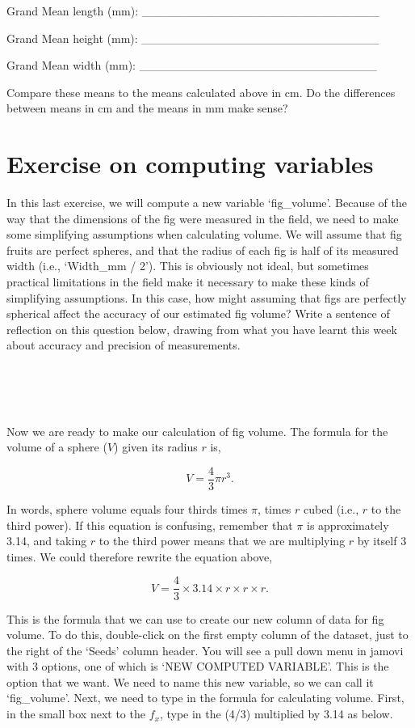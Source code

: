 \documentclass[
]{scrbook}
\begin{document}
Grand Mean length (mm): \_\_\_\_\_\_\_\_\_\_\_\_\_\_\_\_\_\_\_\_\_\_\_\_\_\_\_\_

Grand Mean height (mm): \_\_\_\_\_\_\_\_\_\_\_\_\_\_\_\_\_\_\_\_\_\_\_\_\_\_\_\_

Grand Mean width (mm): \_\_\_\_\_\_\_\_\_\_\_\_\_\_\_\_\_\_\_\_\_\_\_\_\_\_\_\_

Compare these means to the means calculated above in cm.
Do the differences between means in cm and the means in mm make sense?

\hypertarget{computing_variables_02}{%
\section{Exercise on computing variables}\label{computing_variables_02}}

In this last exercise, we will compute a new variable `fig\_volume'.
Because of the way that the dimensions of the fig were measured in the field, we need to make some simplifying assumptions when calculating volume.
We will assume that fig fruits are perfect spheres, and that the radius of each fig is half of its measured width (i.e., `Width\_mm / 2').
This is obviously not ideal, but sometimes practical limitations in the field make it necessary to make these kinds of simplifying assumptions.
In this case, how might assuming that figs are perfectly spherical affect the accuracy of our estimated fig volume?
Write a sentence of reflection on this question below, drawing from what you have learnt this week about accuracy and precision of measurements.

\begin{verbatim}




\end{verbatim}

Now we are ready to make our calculation of fig volume.
The formula for the volume of a sphere (\(V\)) given its radius \(r\) is,

\[V = \frac{4}{3} \pi r^{3}.\]

In words, sphere volume equals four thirds times \(\pi\), times \(r\) cubed (i.e., \(r\) to the third power).
If this equation is confusing, remember that \(\pi\) is approximately 3.14, and taking \(r\) to the third power means that we are multiplying \(r\) by itself 3 times.
We could therefore rewrite the equation above,

\[V = \frac{4}{3} \times 3.14 \times r \times r \times r.\]

This is the formula that we can use to create our new column of data for fig volume.
To do this, double-click on the first empty column of the dataset, just to the right of the `Seeds' column header.
You will see a pull down menu in jamovi with 3 options, one of which is `NEW COMPUTED VARIABLE'.
This is the option that we want.
We need to name this new variable, so we can call it `fig\_volume'.
Next, we need to type in the formula for calculating volume.
First, in the small box next to the \(f_{x}\), type in the (4/3) multiplied by 3.14 as below.
\end{document}
